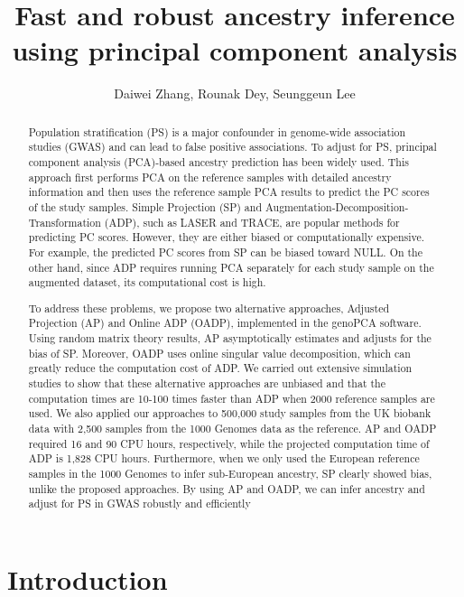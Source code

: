 \documentclass{article}
\title{
  Fast and robust ancestry inference
  using principal component analysis
}
\author{Daiwei Zhang, Rounak Dey, Seunggeun Lee}
\date{}
\begin{document}
\maketitle

\begin{abstract}
    
 Population stratification (PS) is a major confounder in genome-wide association studies (GWAS) and can lead to false positive associations. To adjust for PS, principal component analysis (PCA)-based ancestry prediction has been widely used. This approach first performs PCA on the reference samples with detailed ancestry information and then uses the reference sample PCA results to predict the PC scores of the study samples. Simple Projection (SP) and Augmentation-Decomposition-Transformation (ADP), such as LASER and TRACE, are popular methods for predicting PC scores. However, they are either biased or computationally expensive. For example, the predicted PC scores from SP can be biased toward NULL. On the other hand, since ADP requires running PCA separately for each study sample on the augmented dataset, its computational cost is high.

To address these problems, we propose two alternative approaches, Adjusted Projection (AP) and Online ADP (OADP), implemented in the genoPCA software. Using random matrix theory results, AP asymptotically estimates and adjusts for the bias of SP. Moreover, OADP uses online singular value decomposition, which can greatly reduce the computation cost of ADP. We carried out extensive simulation studies to show that these alternative approaches are unbiased and that the computation times are 10-100 times faster than ADP when 2000 reference samples are used. We also applied our approaches to 500,000 study samples from the UK biobank data with 2,500 samples from the 1000 Genomes data as the reference. AP and OADP required 16 and 90 CPU hours, respectively, while the projected computation time of ADP is 1,828 CPU hours. Furthermore, when we only used the European reference samples in the 1000 Genomes to infer sub-European ancestry, SP clearly showed bias, unlike the proposed approaches. By using AP and OADP, we can infer ancestry and adjust for PS in GWAS robustly and efficiently   
    
\end{abstract}

\section{Introduction}
\end{document}
